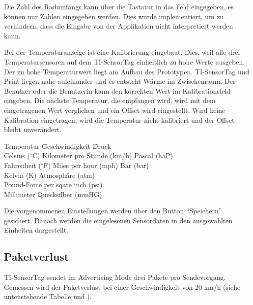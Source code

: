 Die Zahl des Radumfangs kann über die Tastatur in das Feld eingegeben, es können nur Zahlen eingegeben werden. Dies wurde implementiert, um zu verhindern, dass die Eingabe von der Applikation nicht interpretiert werden kann.

Bei der Temperaturanzeige ist eine Kalibrierung eingebaut. Dies, weil alle drei Temperatursensoren auf dem TI-SensorTag einheitlich zu hohe Werte ausgeben. Der zu hohe Temperaturwert liegt am Aufbau des Prototypen. TI-SensorTag und Print liegen nahe aufeinander und es entsteht Wärme im Zwischenraum. Der Benutzer oder die Benutzerin kann den korrekten Wert im Kalibrationsfeld eingeben. Die nächste Temperatur, die empfangen wird, wird mit dem eingetragenen Wert verglichen und ein Offset wird eingestellt. Wird keine Kalibration eingetragen, wird die Temperatur nicht kalibriert und der Offset bleibt unverändert.

\begin{minipage}{\textwidth}
    \begin{tabbing}
    Temperatur\hspace{.3cm} \quad\= Geschwindigkeit\hspace{2.7cm} \quad\= Druck \\[0.8ex]
    Celsius ($^{\circ}$C)    \> Kilometer pro Stunde (km/h)\> Pascal (haP)\\
    Fahrenheit ($^{\circ}$F) \> Miles per hour (mph)       \> Bar (bar)\\
    Kelvin (K)     \>                            \> Atmosph\"{a}re (atm)\\
                   \>                      \> Pound-Force per sqare inch (psi)\\
                   \>                      \> Millimeter Quecksilber (mmHG)\\
    \end{tabbing}
\end{minipage}
  
Die vorgenommenen Einstellungen werden über den Button ``Speichern'' gesichert. Danach werden die eingelesenen Sensordaten in den ausgewählten Einheiten dargestellt.

\subsection{Paketverlust}

TI-SensorTag sendet im Advertising Mode drei Pakete pro Sendevorgang. Gemessen wird der Paketverlust bei einer Geschwindigkeit von 20 km/h (siehe untenstehende Tabelle und ).   

